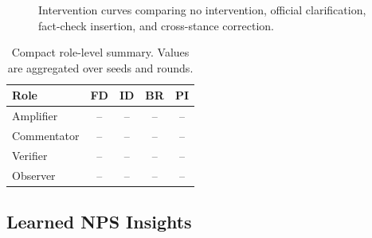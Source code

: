 \begin{figure}[t]
\centering
{}
\caption{Intervention curves comparing no intervention, official clarification, fact-check insertion, and cross-stance correction.}
\label{fig:nps-intervention}
\end{figure}

\begin{table}[t]
\centering
\small
\setlength{\tabcolsep}{3.0pt}
\begin{tabular}{lcccc}
\toprule
\textbf{Role} & \textbf{FD} & \textbf{ID} & \textbf{BR} & \textbf{PI} \\
\midrule
Amplifier & -- & -- & -- & -- \\
Commentator & -- & -- & -- & -- \\
Verifier & -- & -- & -- & -- \\
Observer & -- & -- & -- & -- \\
\bottomrule
\end{tabular}
\caption{Compact role-level summary. Values are aggregated over seeds and rounds.}
\label{tab:nps-role-summary}
\end{table}

\subsection{Learned NPS Insights}
\label{sec:nps-analysis}


